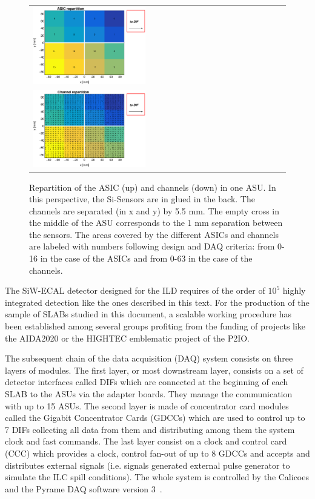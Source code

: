 \documentclass[final,3p,times,twocolumn]{elsarticle}
\begin{document}
\begin{figure}[!t]
  \centering
  \begin{tabular}{l}
    \includegraphics[width=0.45\textwidth]{../figs/ASU_geometry1.eps}  \\
    \includegraphics[width=0.45\textwidth]{../figs/ASU_geometry2.eps}  \\
  \end{tabular}
  \caption{Repartition of the ASIC (up) and channels (down) in one ASU. In this perspective, the Si-Sensors are in glued in the back.
    The channels are separated (in x and y) by 5.5 mm.
    The empty cross in the middle of the ASU corresponds to the 1 mm separation between the sensors.
    The areas covered by the different ASICs and channels
    are labeled with numbers following design and DAQ criteria: from 0-16 in the case of the ASICs and from 0-63 in the case of the channels.
  }
\label{ASU}
\end{figure}

The SiW-ECAL detector designed for the ILD requires of the order
of $10^{5}$ highly integrated detection like the ones described in this text.
For the production of the sample of SLABs studied in this document,
a scalable working procedure has been established among several groups \cite{Boudry:2318814}
profiting from the funding of projects like the AIDA2020 or the HIGHTEC emblematic project
of the P2IO.

The subsequent chain of the data acquisition (DAQ) system \cite{Gastaldi:2014vaa} consists on three layers of modules.
The first layer, or most downstream layer, consists on a set of detector interfaces called DIFs which are connected
at the beginning of each SLAB to the ASUs via the adapter boards. They manage the communication with up to 15 ASUs.
The second layer is made of concentrator card modules called the Gigabit Concentrator Cards (GDCCs)
which are used to control up to 7 DIFs collecting all data from them and distributing among them the system clock and fast commands.
The last layer consist on a clock and control card (CCC) which
provides a clock, control fan-out of up to 8 GDCCs and accepts and distributes external signals (i.e. signals
generated external pulse generator to simulate the ILC spill conditions).
The whole system is controlled by the Calicoes and the Pyrame DAQ software version 3~\cite{Rubio-Roy:2017ere,Magniette:2018wdz}.
\end{document}
